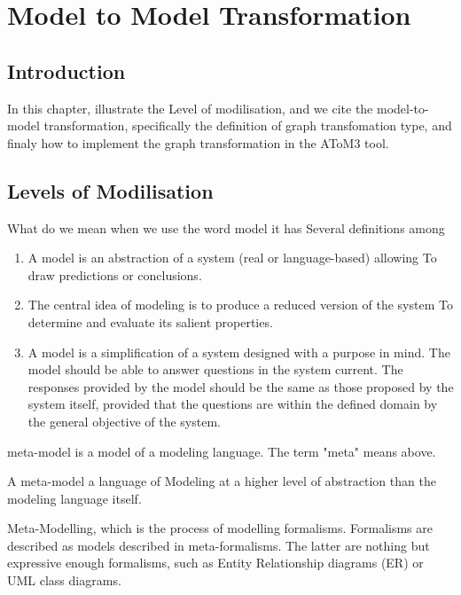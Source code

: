 \chapter{\label{cha: Graph Transformation}Model to Model Transformation}

\section{Introduction}
In this chapter, illustrate the Level of modilisation, and we cite the model-to-model transformation, specifically the definition of graph transfomation type, and finaly how to implement the graph transformation in the AToM3 tool.

\section{Levels of Modilisation}

What do we mean when we use the word model it has Several definitions among

\begin{enumerate}
\item A model is an abstraction of a system (real or language-based) allowing
To draw predictions or conclusions\cite{ch3-matters}. 
\item The central idea of modeling is to produce a reduced version of the system To determine and evaluate its salient properties\cite{ch3-selic}. 

\item A model is a simplification of a system designed with a purpose in mind.
The model should be able to answer questions in the system
current. The responses provided by the model should be the same as those proposed by the system itself, provided that the questions are within the defined domain by the general objective of the system\cite{ch3-def}.

\end{enumerate}

meta-model is a model of a modeling language. The term "meta" means above.

A meta-model  a language of Modeling at a higher level of abstraction than the modeling language itself\cite{ch3-applied}.


Meta-Modelling, which is the process of modelling formalisms. 
Formalisms are described as models described in meta-formalisms. 
The latter are nothing  but expressive enough formalisms, such as Entity Relationship diagrams (ER) or UML class diagrams.

